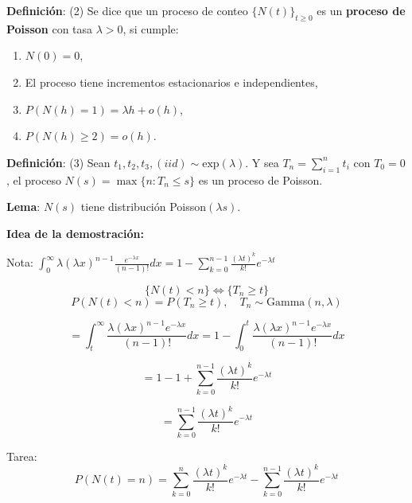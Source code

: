 \documentclass[12pt,a4paper]{article}
\newcommand{\definicion}[1]{%
\begin{definicionbox}
\textbf{Definición}: #1
\end{definicionbox}
}
\newcommand{\lema}[1]{%
\begin{lemabox}
\textbf{Lema}: #1
\end{lemabox}
}
\begin{document}
\definicion{(2) Se dice que un proceso de conteo $\{N(t)\}_{t \geq 0}$ es un \textbf{proceso de Poisson} con tasa $\lambda > 0$, si cumple:
\begin{enumerate}
    \item $N(0) = 0$,
    \item El proceso tiene incrementos estacionarios e independientes,
    \item $P(N(h) = 1) = \lambda h + o(h)$,
    \item $P(N(h) \geq 2) = o(h)$.
\end{enumerate}}

\definicion{(3) Sean $t_1, t_2, t_3, (iid) \sim \text{exp}(\lambda)$. Y sea $T_n = \sum_{i=1}^{n} t_i$ con $T_0 = 0$, el proceso $N(s) = \max\{n : T_n \leq s\}$ es un proceso de Poisson.}


\lema{$N(s)$ tiene distribución Poisson$(\lambda s)$.}

\textbf{Idea de la demostración:}

Nota: $\int_0^{\infty} \lambda (\lambda x)^{n-1} \frac{e^{-\lambda x}}{(n-1)!} dx = 1 - \sum_{k=0}^{n-1} \frac{(\lambda t)^k}{k!} e^{-\lambda t}$

\begin{equation*}
\{N(t) < n\} \Leftrightarrow \{T_n \geq t\}
\end{equation*}
\begin{equation*}
P(N(t) < n) = P(T_n \geq t), \quad T_n \sim \text{Gamma}(n, \lambda)
\end{equation*}

\begin{equation*}
= \int_t^{\infty} \frac{\lambda (\lambda x)^{n-1} e^{-\lambda x}}{(n-1)!} dx = 1 - \int_0^t \frac{\lambda (\lambda x)^{n-1} e^{-\lambda x}}{(n-1)!} dx
\end{equation*}

\begin{equation*}
= 1 - 1 + \sum_{k=0}^{n-1} \frac{(\lambda t)^k}{k!} e^{-\lambda t}
\end{equation*}

\begin{equation*}
= \sum_{k=0}^{n-1} \frac{(\lambda t)^k}{k!} e^{-\lambda t}
\end{equation*}

Tarea:
\begin{equation*}
P(N(t) = n) = \sum_{k=0}^{n} \frac{(\lambda t)^k}{k!} e^{-\lambda t} - \sum_{k=0}^{n-1} \frac{(\lambda t)^k}{k!} e^{-\lambda t}
\end{equation*}
\end{document}
